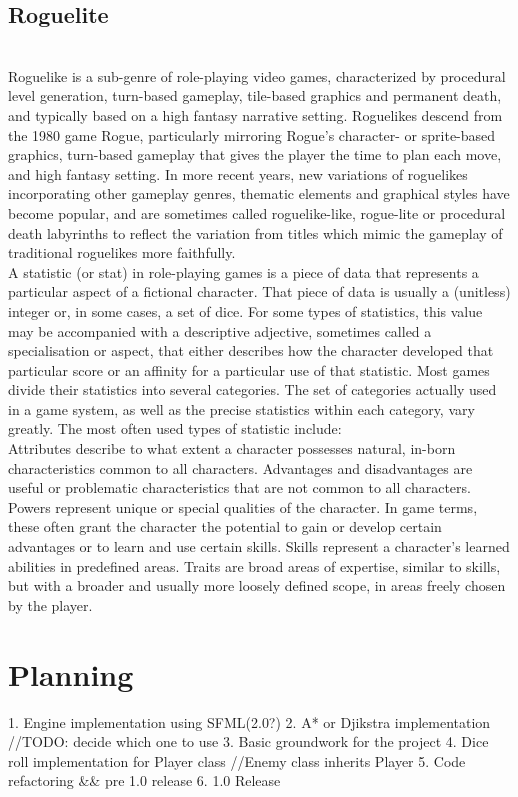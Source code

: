 \documentclass{article}
\begin{document}
	\subsection{Roguelite}
\\
Roguelike is a sub-genre of role-playing video games, characterized by procedural
level generation, turn-based gameplay, tile-based graphics and permanent death,
and typically based on a high fantasy narrative setting. Roguelikes descend from
the 1980 game Rogue, particularly mirroring Rogue's character- or sprite-based
graphics, turn-based gameplay that gives the player the time to plan each move,
and high fantasy setting. In more recent years, new variations of roguelikes
incorporating other gameplay genres, thematic elements and graphical styles have
become popular, and are sometimes called roguelike-like, rogue-lite or
procedural death labyrinths to reflect the variation from titles which mimic
the gameplay of traditional roguelikes more faithfully.
\\
A statistic (or stat) in role-playing games is a piece of data that represents
a particular aspect of a fictional character. That piece of data is usually
a (unitless) integer or, in some cases, a set of dice. For some types of statistics,
this value may be accompanied with a descriptive adjective, sometimes called a
specialisation or aspect, that either describes how the character developed that
particular score or an affinity for a particular use of that statistic.
Most games divide their statistics into several categories. The set of categories
actually used in a game system, as well as the precise statistics within each
category, vary greatly.
The most often used types of statistic include:
\\
Attributes describe to what extent a character possesses natural, in-born
characteristics common to all characters.
Advantages and disadvantages are useful or problematic characteristics that are
not common to all characters.
Powers represent unique or special qualities of the character. In game terms,
these often grant the character the potential to gain or develop certain advantages
or to learn and use certain skills.
Skills represent a character's learned abilities in predefined areas.
Traits are broad areas of expertise, similar to skills, but with a broader and
usually more loosely defined scope, in areas freely chosen by the player.
\\
\section{Planning}
	1. Engine implementation using SFML(2.{0?})
	2. A* or Djikstra implementation				//TODO: decide which one to use
	3. Basic groundwork for the project
	4. Dice roll implementation for Player class	//Enemy class inherits Player
	5. Code refactoring && pre 1.0 release
	6. 1.0 Release
\\
\end{document}
